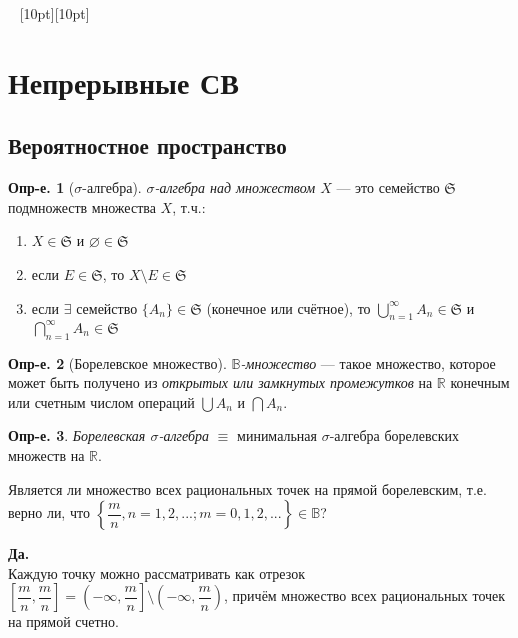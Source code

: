 \documentclass[a4paper,12pt,fleqn]{article}
\newenvironment{onsamepage} {\begin{minipage}{\textwidth}} {\end{minipage}}
\numberwithin{figure}{section}
\theoremstyle{definition}
\newtheorem{definition}{Опр-е.}[section]
\let\DS\displaystyle
\def\B{\mathbb{B}}
\def\R{\mathbb{R}}
\def\S{\mathfrak{S}}
\def\mbyn{\dfrac{m}{n}}
\def\vignette{\vspace{48pt} \noindent \hrulefill~
	          \raisebox{-8pt}[10pt][10pt]{\Huge\ding{102}}
	          ~\hrulefill}
\begin{document}
\vignette
\section{Непрерывные СВ}


\subsection{Вероятностное пространство}

\begin{onsamepage}
\begin{definition}[$\sigma$-алгебра]
\textit{$\sigma$-алгебра над множеством $X$}
--- это семейство $\S$ подмножеств множества $X$, т.ч.:
\begin{enumerate}
	\item $X \in \S$ и $\varnothing \in \S$
	\item если $E \in \S$, то $X \setminus E \in \S$
	\item если $\exists$ семейство $\{A_n\} \in \S$ (конечное или счётное),
	      то $\DS \bigcup_{n=1}^{\infty} A_n \in \S$
	      и $\DS \bigcap_{n=1}^{\infty} A_n \in \S$
\end{enumerate}
\end{definition}
\end{onsamepage}

\begin{definition}[Борелевское множество]
	\textit{$\B$-множество} --- такое множество, которое может быть
	получено из \textit{открытых или замкнутых промежутков} на $\R$
	конечным или счетным числом операций $\bigcup A_n$ и $\bigcap A_n$.
\end{definition}

\begin{definition}
	\textit{Борелевская $\sigma$-алгебра} $\equiv$ минимальная
	$\sigma$-алгебра борелевских множеств на $\R$.
\end{definition}

\medskip
\begin{problem}
	Является ли множество всех рациональных точек на прямой борелевским,
	т.е. верно ли, что
	$\left\{ \mbyn, n=1,2,...; m=0,1,2,... \right\} \in \B$?
\end{problem}
\begin{solution}
	{\bfseries Да.}\\
	Каждую точку можно рассматривать как отрезок
	$\left[ \mbyn,\mbyn \right] =
	\left( -\infty, \mbyn \right] \setminus \left( -\infty, \mbyn \right)$,
	причём множество всех рациональных точек на прямой счетно.
\end{solution}
\end{document}
